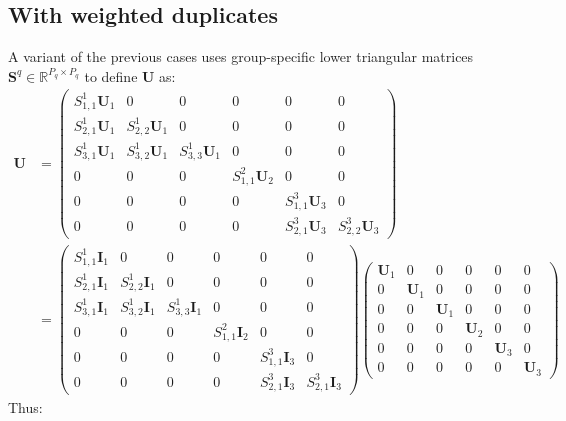 \documentclass[12pt]{scrartcl}
\begin{document}
\subsection{With weighted duplicates}
A variant of the previous cases uses group-specific lower triangular matrices $\mathbf{S}^q \in \mathbb{R}^{P_q \times P_q}$ to define $\mathbf{U}$ as: 
\begin{align}
\mathbf{U} & = \left( \begin{array}{ccc|c|ccc}
S^1_{1,1} \mathbf{U}_1 & 0 & 0 & 0 & 0 & 0 \\
S^1_{2,1} \mathbf{U}_1 & S^1_{2,2} \mathbf{U}_1 & 0 & 0 & 0 & 0 \\
S^1_{3,1} \mathbf{U}_1 & S^1_{3,2} \mathbf{U}_1 & S^1_{3,3} \mathbf{U}_1 & 0 & 0 & 0 \\
\hline
0 & 0 & 0 & S^2_{1,1} \mathbf{U}_2 & 0 & 0 \\[0.3ex]
\hline
0 & 0 & 0 & 0 & S^3_{1,1} \mathbf{U}_3 & 0 \\
0 & 0 & 0 & 0 & S^3_{2,1} \mathbf{U}_3 & S^3_{2,2} \mathbf{U}_3
\end{array} \right) \nonumber \\
& = \left( \begin{array}{ccc|c|ccc}
S^1_{1,1} \mathbf{I}_1 & 0 & 0 & 0 & 0 & 0 \\
S^1_{2,1} \mathbf{I}_1 & S^1_{2,2} \mathbf{I}_1 & 0 & 0 & 0 & 0 \\
S^1_{3,1} \mathbf{I}_1 & S^1_{3,2} \mathbf{I}_1 & S^1_{3,3} \mathbf{I}_1 & 0 & 0 & 0 \\
\hline
0 & 0 & 0 & S^2_{1,1} \mathbf{I}_2 & 0 & 0 \\[0.3ex]
\hline
0 & 0 & 0 & 0 & S^3_{1,1} \mathbf{I}_3 & 0 \\
0 & 0 & 0 & 0 & S^3_{2,1} \mathbf{I}_3 & S^3_{2,1} \mathbf{I}_3
\end{array} \right) \left( \begin{array}{ccc|c|cc}
\mathbf{U}_1 & 0 & 0 & 0 & 0 & 0 \\
0 & \mathbf{U}_1 & 0 & 0 & 0 & 0 \\
0 & 0 & \mathbf{U}_1 & 0 & 0 & 0 \\[0.3ex]
\hline
0 & 0 & 0 & \mathbf{U}_2 & 0 & 0 \\[0.3ex]
\hline
0 & 0 & 0 & 0 & \mathbf{U}_3 & 0 \\
0 & 0 & 0 & 0 & 0 & \mathbf{U}_3
\end{array} \right)
\end{align}
Thus:
\end{document}
